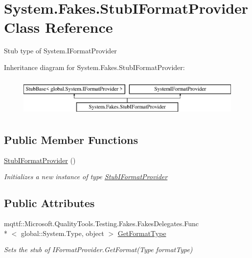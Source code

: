 \hypertarget{class_system_1_1_fakes_1_1_stub_i_format_provider}{\section{System.\-Fakes.\-Stub\-I\-Format\-Provider Class Reference}
\label{class_system_1_1_fakes_1_1_stub_i_format_provider}
}


Stub type of System.\-I\-Format\-Provider 


Inheritance diagram for System.\-Fakes.\-Stub\-I\-Format\-Provider\-:\begin{figure}[H]
\begin{center}
\leavevmode
\includegraphics[height=2.000000cm]{class_system_1_1_fakes_1_1_stub_i_format_provider}
\end{center}
\end{figure}
\subsection*{Public Member Functions}
\begin{DoxyCompactItemize}
\item 
\hyperlink{class_system_1_1_fakes_1_1_stub_i_format_provider_afe84ee659f6ef565af6c38ec2cb930c0}{Stub\-I\-Format\-Provider} ()
\begin{DoxyCompactList}\small\item\em Initializes a new instance of type \hyperlink{class_system_1_1_fakes_1_1_stub_i_format_provider}{Stub\-I\-Format\-Provider}\end{DoxyCompactList}\end{DoxyCompactItemize}
\subsection*{Public Attributes}
\begin{DoxyCompactItemize}
\item 
mqttf\-::\-Microsoft.\-Quality\-Tools.\-Testing.\-Fakes.\-Fakes\-Delegates.\-Func\\*
$<$ global\-::\-System.\-Type, object $>$ \hyperlink{class_system_1_1_fakes_1_1_stub_i_format_provider_a5b2d6d1b43d59df6f2f1144c92130e70}{Get\-Format\-Type}
\begin{DoxyCompactList}\small\item\em Sets the stub of I\-Format\-Provider.\-Get\-Format(\-Type format\-Type)\end{DoxyCompactList}\end{DoxyCompactItemize}


